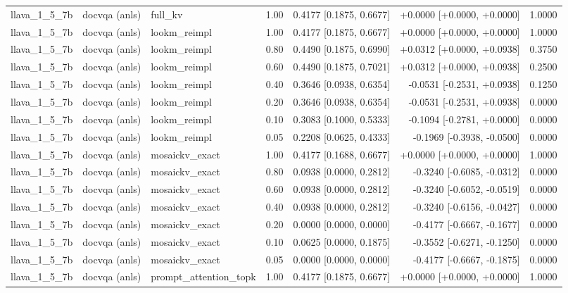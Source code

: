 \begin{longtable}{lllrrrr}
llava\_1\_5\_7b & docvqa (anls) & full\_kv & 1.00 & 0.4177 [0.1875, 0.6677] & +0.0000 [+0.0000, +0.0000] & 1.0000 \\
llava\_1\_5\_7b & docvqa (anls) & lookm\_reimpl & 1.00 & 0.4177 [0.1875, 0.6677] & +0.0000 [+0.0000, +0.0000] & 1.0000 \\
llava\_1\_5\_7b & docvqa (anls) & lookm\_reimpl & 0.80 & 0.4490 [0.1875, 0.6990] & +0.0312 [+0.0000, +0.0938] & 0.3750 \\
llava\_1\_5\_7b & docvqa (anls) & lookm\_reimpl & 0.60 & 0.4490 [0.1875, 0.7021] & +0.0312 [+0.0000, +0.0938] & 0.2500 \\
llava\_1\_5\_7b & docvqa (anls) & lookm\_reimpl & 0.40 & 0.3646 [0.0938, 0.6354] & -0.0531 [-0.2531, +0.0938] & 0.1250 \\
llava\_1\_5\_7b & docvqa (anls) & lookm\_reimpl & 0.20 & 0.3646 [0.0938, 0.6354] & -0.0531 [-0.2531, +0.0938] & 0.0000 \\
llava\_1\_5\_7b & docvqa (anls) & lookm\_reimpl & 0.10 & 0.3083 [0.1000, 0.5333] & -0.1094 [-0.2781, +0.0000] & 0.0000 \\
llava\_1\_5\_7b & docvqa (anls) & lookm\_reimpl & 0.05 & 0.2208 [0.0625, 0.4333] & -0.1969 [-0.3938, -0.0500] & 0.0000 \\
llava\_1\_5\_7b & docvqa (anls) & mosaickv\_exact & 1.00 & 0.4177 [0.1688, 0.6677] & +0.0000 [+0.0000, +0.0000] & 1.0000 \\
llava\_1\_5\_7b & docvqa (anls) & mosaickv\_exact & 0.80 & 0.0938 [0.0000, 0.2812] & -0.3240 [-0.6085, -0.0312] & 0.0000 \\
llava\_1\_5\_7b & docvqa (anls) & mosaickv\_exact & 0.60 & 0.0938 [0.0000, 0.2812] & -0.3240 [-0.6052, -0.0519] & 0.0000 \\
llava\_1\_5\_7b & docvqa (anls) & mosaickv\_exact & 0.40 & 0.0938 [0.0000, 0.2812] & -0.3240 [-0.6156, -0.0427] & 0.0000 \\
llava\_1\_5\_7b & docvqa (anls) & mosaickv\_exact & 0.20 & 0.0000 [0.0000, 0.0000] & -0.4177 [-0.6667, -0.1677] & 0.0000 \\
llava\_1\_5\_7b & docvqa (anls) & mosaickv\_exact & 0.10 & 0.0625 [0.0000, 0.1875] & -0.3552 [-0.6271, -0.1250] & 0.0000 \\
llava\_1\_5\_7b & docvqa (anls) & mosaickv\_exact & 0.05 & 0.0000 [0.0000, 0.0000] & -0.4177 [-0.6667, -0.1875] & 0.0000 \\
llava\_1\_5\_7b & docvqa (anls) & prompt\_attention\_topk & 1.00 & 0.4177 [0.1875, 0.6677] & +0.0000 [+0.0000, +0.0000] & 1.0000 \\

\end{longtable}
